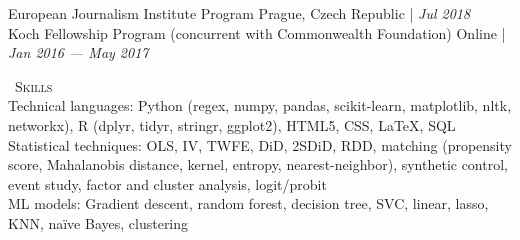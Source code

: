 \documentclass[a4paper,11pt]{article}
\newcommand{\header} [1] {
    \vspace*{1mm}
    {\textsc{\large{\xrfill[0.1ex]{0.5pt}~#1~\xrfill[0.1ex]{0.5pt}}}} %
    \vspace*{1mm}
}
\begin{document}
European Journalism Institute Program \hfill Prague, Czech Republic |  \emph{Jul 2018} \\

Koch Fellowship Program (concurrent with Commonwealth Foundation) \hfill Online |  \emph{Jan 2016 --- May 2017}

\vspace{1mm}
\header{Skills} \\
Technical languages: Python (regex, numpy, pandas, scikit-learn, matplotlib, nltk, networkx), R (dplyr, tidyr, stringr, ggplot2), HTML5, CSS, \LaTeX, SQL \\

Statistical techniques: OLS, IV, TWFE, DiD, 2SDiD, RDD, matching (propensity score, Mahalanobis distance, kernel, entropy, nearest-neighbor), synthetic control, event study, factor and cluster analysis, logit/probit \\

ML models: Gradient descent, random forest, decision tree, SVC, linear, lasso, KNN, na\"{i}ve Bayes, clustering
\end{document}
